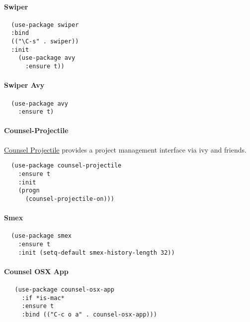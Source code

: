 \documentclass[11pt]{article}
\begin{document}
\paragraph*{Swiper}
\label{sec:org44dd635}

\begin{verbatim}
  (use-package swiper
  :bind
  (("\C-s" . swiper))
  :init
    (use-package avy
      :ensure t))
\end{verbatim}

\paragraph*{Swiper Avy}
\label{sec:org30195f1}

\begin{verbatim}
  (use-package avy
    :ensure t)
\end{verbatim}

\paragraph*{Counsel-Projectile}
\label{sec:orgbe8bbd4}

\href{https://github.com/ericdanan/counsel-projectile}{Counsel Projectile} provides a project management interface via ivy and
friends.

\begin{verbatim}
  (use-package counsel-projectile
    :ensure t
    :init
    (progn
      (counsel-projectile-on)))
\end{verbatim}

\paragraph*{Smex}
\label{sec:orgb90303f}

\begin{verbatim}
  (use-package smex
    :ensure t
    :init (setq-default smex-history-length 32))
\end{verbatim}

\paragraph*{Counsel OSX App}
\label{sec:orgb35e437}

\begin{verbatim}
   (use-package counsel-osx-app
     :if *is-mac*
     :ensure t
     :bind (("C-c o a" . counsel-osx-app)))
\end{verbatim}
\end{document}
